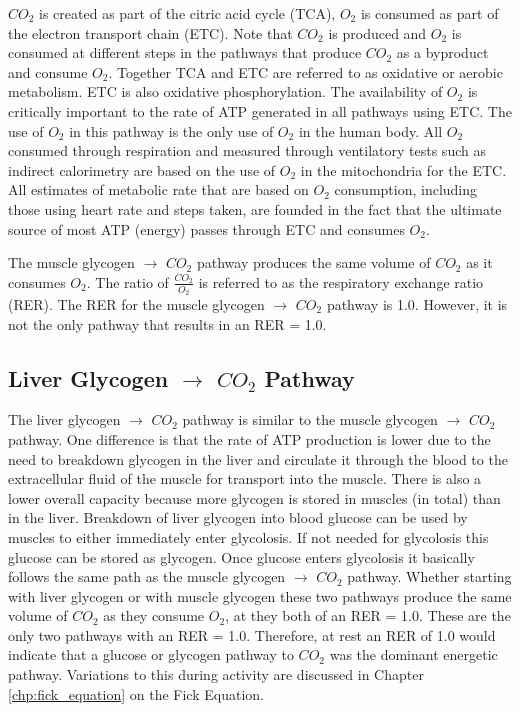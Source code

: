 $CO_2$ is created as part of the citric acid cycle (TCA), $O_2$ is consumed as part of the electron transport chain (ETC). Note that $CO_2$ is produced and $O_2$ is consumed at different steps in the pathways that produce $CO_2$ as a byproduct and consume $O_2$. Together TCA and ETC are referred to as oxidative or aerobic metabolism. ETC is also oxidative phosphorylation. The availability of $O_2$ is critically important to the rate of ATP generated in all pathways using ETC. The use of $O_2$ in this pathway is the only use of $O_2$ in the human body. All $O_2$ consumed through respiration and measured through ventilatory tests such as indirect calorimetry are based on the use of $O_2$ in the mitochondria for the ETC. All estimates of metabolic rate that are based on $O_2$ consumption, including those using heart rate and steps taken, are founded in the fact that the ultimate source of most ATP (energy) passes through ETC and consumes $O_2$.

The muscle glycogen $\rightarrow$ $CO_2$ pathway produces the same volume of $CO_2$ as it consumes $O_2$. The ratio of $\frac{CO_2}{O_2}$ is referred to as the respiratory exchange ratio (RER). The RER for the muscle glycogen $\rightarrow$ $CO_2$ pathway is 1.0. However, it is not the only pathway that results in an RER = 1.0. 


\subsection{Liver Glycogen $\rightarrow$ $CO_2$ Pathway}

The liver glycogen $\rightarrow$ $CO_2$ pathway is similar to the muscle glycogen $\rightarrow$ $CO_2$ pathway. One difference is that the rate of ATP production is lower due to the need to breakdown glycogen in the liver and circulate it through the blood to the extracellular fluid of the muscle for transport into the muscle. There is also a lower overall capacity because more glycogen is stored in muscles (in total) than in the liver. Breakdown of liver glycogen into blood glucose can be used by muscles to either immediately enter glycolosis. If not needed for glycolosis this glucose can be stored as glycogen. Once glucose enters glycolosis it basically follows the same path as the muscle glycogen $\rightarrow$ $CO_2$ pathway. Whether starting with liver glycogen or with muscle glycogen these two pathways produce the same volume of $CO_2$ as they consume $O_2$, at they both of an RER = 1.0. These are the only two pathways with an RER = 1.0. Therefore, at rest an RER of 1.0 would indicate that a glucose or glycogen pathway to $CO_2$ was the dominant energetic pathway. Variations to this during activity are discussed in Chapter \ref{chp:fick_equation} on the Fick Equation.


